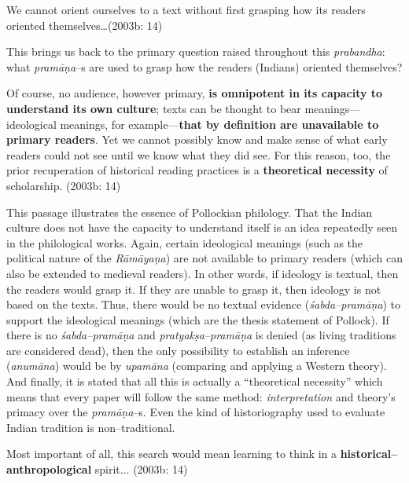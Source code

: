 \begin{myquote}
We cannot orient ourselves to a text without ﬁrst grasping how its readers oriented themselves…(2003b: 14)
\end{myquote}

This brings us back to the primary question raised throughout this \textit{prabandha}: what \textit{pramāṇa}–s are used to grasp how the readers (Indians) oriented themselves?

\begin{myquote}
Of course, no audience, however primary, \textbf{is omnipotent in its capacity to understand its own culture}; texts can be thought to bear meanings—ideological meanings, for example—\textbf{that by deﬁnition are unavailable to primary readers}. Yet we cannot possibly know and make sense of what early readers could not see until we know what they did see. For this reason, too, the prior recuperation of historical reading practices is a \textbf{theoretical necessity} of scholarship. (2003b: 14)
\end{myquote}

This passage illustrates the essence of Pollockian philology. That the Indian culture does not have the capacity to understand itself is an idea repeatedly seen in the philological works. Again, certain ideological meanings (such as the political nature of the \textit{Rāmāyaṇa}) are not available to primary readers (which can also be extended to medieval readers). In other words, if ideology is textual, then the readers would grasp it. If they are unable to grasp it, then ideology is not based on the texts. Thus, there would be no textual evidence (\textit{śabda–pramāṇa}) to support the ideological meanings (which are the thesis statement of Pollock). If there is no \textit{śabda–pramāṇa} and \textit{pratyakṣa–pramāṇa }is denied (as living traditions are considered dead), then the only possibility to establish an inference (\textit{anumāna}) would be by \textit{upamāna} (comparing and applying a Western theory). And finally, it is stated that all this is actually a “theoretical necessity” which means that every paper will follow the same method: \textit{interpretation} and theory’s primacy over the \textit{pramāṇa}–s. Even the kind of historiography used to evaluate Indian tradition is non–traditional.

\begin{myquote}
Most important of all, this search would mean learning to think in a \textbf{historical–anthropological} spirit... (2003b: 14)
\end{myquote}

